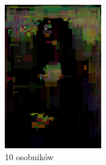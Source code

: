 \begin{figure}[!htb]
\begin{subfigure}[b]{0.3\textwidth}
         \includegraphics[width=\textwidth]{images/mona/num_of_best/10.png}
         \caption{10 osobników}
    \end{subfigure}
    \begin{subfigure}[b]{0.3\textwidth}
        \centering
        \label{fig:num_of_best_50}

\end{subfigure}
\end{figure}

